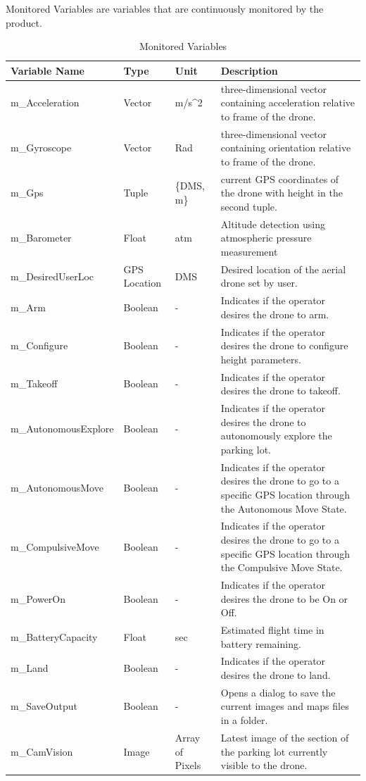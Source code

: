 \documentclass{article}
\begin{document}
\newpage
Monitored Variables are variables that are continuously monitored by the product.
\begin{table}[!h]
\begin{center}
\caption {Monitored Variables} \label{tab:title}
\begin{tabular}{ | m{3cm} | m{2cm} | m{2cm} | m{6cm} | } 
\hline
 Variable Name & Type & Unit & Description \\ 
 \hline
m\_Acceleration	& Vector& m/s^2 & three-dimensional vector containing acceleration relative to frame of the drone. \\
\hline
m\_Gyroscope & Vector	&Rad &	 three-dimensional vector containing orientation relative to frame of the drone.\\
\hline
m\_Gps	& Tuple &	\{DMS, m\} &	 current GPS coordinates of the drone with height in the second tuple.\\
\hline
m\_Barometer	& Float&	atm	 &Altitude detection using atmospheric pressure measurement\\
\hline
m\_DesiredUserLoc &	GPS Location& DMS &	 Desired location of the aerial drone set by user.\\
\hline
m\_Arm &	Boolean	 &  - &	Indicates if the operator desires the drone to arm.  \\
\hline
m\_Configure &	Boolean	 &  - &	Indicates if the operator desires the drone to configure height parameters.  \\
\hline
m\_Takeoff &	Boolean	 &  - &	Indicates if the operator desires the drone to takeoff.  \\
\hline
m\_AutonomousExplore &	Boolean &	 -	 &Indicates if the operator desires the drone to autonomously explore the parking lot.\\ 
\hline
m\_AutonomousMove &	Boolean &	 -	 & Indicates if the operator desires the drone to go to a specific GPS location through the Autonomous Move State.\\ 
\hline
m\_CompulsiveMove &	Boolean &	 -	 &Indicates if the operator desires the drone to go to a specific GPS location through the Compulsive Move State.\\ 
\hline
m\_PowerOn&	Boolean  &	- &	Indicates if the operator desires the drone to be On or Off.\\
\hline
m\_BatteryCapacity&	Float  &	sec &	Estimated flight time in battery remaining. \\
\hline
m\_Land&Boolean&	-&	Indicates if the operator desires the drone to land.\\
\hline
m\_SaveOutput&Boolean&	-&	Opens a dialog to save the current images and maps files in a folder.\\
\hline
 m\_CamVision &	Image&	Array of Pixels&	Latest image of the section of the parking lot currently visible to the drone.\\
\hline

\end{tabular}
\end{center}
\end{table}
\end{document}
